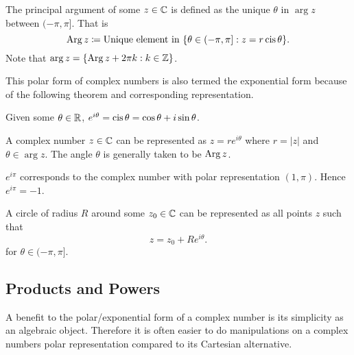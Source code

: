 \documentclass[../notes.tex]{subfiles}
\begin{document}
\begin{definition}
    The principal argument of some $z \in \mathbb{C}$ is defined as the unique $\theta$ in $\arg z$ between $(-\pi, \pi]$. That is
    \[
        \operatorname{Arg} z \coloneq \text{Unique element in }\qty{\theta \in (-\pi, \pi] : z = r \operatorname{cis}\theta}
    .\]
    Note that $\arg z = \qty{\operatorname{Arg}z + 2 \pi k : k \in \mathbb{Z}}$.
\end{definition}

This polar form of complex numbers is also termed the exponential form because of the following theorem and corresponding representation.

\begin{theorem}
    \label{thm:eulers}
    Given some $\theta \in \mathbb{R}$, $e^{i \theta} = \operatorname{cis} \theta = \cos \theta + i \sin \theta$.
\end{theorem}

\begin{definition}
    A complex number $z \in \mathbb{C}$ can be represented as $z = r e^{i \theta}$ where $r = |z|$ and $\theta \in \arg z$. The angle $\theta$ is generally taken to be $\operatorname{Arg} z$.
\end{definition}

\begin{example}
    $e^{i \pi}$ corresponds to the complex number with polar representation $(1, \pi)$. Hence $e^{i \pi} = -1$.
\end{example}

\begin{example}
    A circle of radius $R$ around some $z_0 \in \mathbb{C}$ can be represented as all points $z$ such that
    \[
        z = z_0 + Re^{i \theta}
    .\]
    for $\theta \in (-\pi, \pi]$.
\end{example}

\subsection{Products and Powers}

A benefit to the polar/exponential form of a complex number is its simplicity as an algebraic object. Therefore it is often easier to do manipulations on a complex numbers polar representation compared to its Cartesian alternative.
\end{document}
